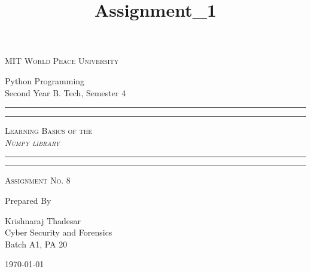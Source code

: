 \documentclass[11pt]{article}
\title{Assignment\_1}
\begin{document}
\begin{titlepage}
    \centering


    \huge\textsc{
        MIT World Peace University
    }\\

    \vspace{0.75\baselineskip} %

    \LARGE{
        Python Programming\\
        Second Year B. Tech, Semester 4
    }

    \vfill %


    \rule{\textwidth}{1.6pt}\vspace*{-\baselineskip}\vspace*{2pt}
    \rule{\textwidth}{0.6pt}
    \vspace{0.75\baselineskip} %



    \huge{\textsc{
            Learning Basics of the \\
            \textit{Numpy library}
        }} \\



    \vspace{0.5\baselineskip} %
    \rule{\textwidth}{0.6pt}\vspace*{-\baselineskip}\vspace*{2.8pt}
    \rule{\textwidth}{1.6pt}

    \vspace{1\baselineskip} %


    \LARGE\textsc{
        Assignment No. 8
    } %
    \vfill


    Prepared By
    \vspace{0.5\baselineskip} %

    \Large{
        Krishnaraj Thadesar \\
        Cyber Security and Forensics\\
        Batch A1, PA 20
    }


    \vspace{0.5\baselineskip} %
    \today

\end{titlepage}
\end{document}
